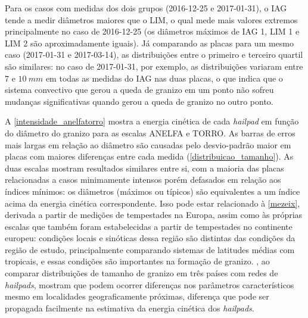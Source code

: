 Para os casos com medidas dos dois grupos (2016-12-25 e 2017-01-31), o IAG tende a medir diâmetros maiores que o LIM, o qual mede mais valores extremos principalmente no caso de 2016-12-25 (os diâmetros máximos de IAG 1, LIM 1 e LIM 2 são aproximadamente iguais). Já comparando as placas para um mesmo caso (2017-01-31 e 2017-03-14), as distribuições entre o primeiro e terceiro quartil são similares: no caso de 2017-01-31, por exemplo, as distribuições variaram entre $7$ e $10\:mm$ em todas as medidas do IAG nas duas placas, o que indica que o sistema convectivo que gerou a queda de granizo em um ponto não sofreu mudanças significativas quando gerou a queda de granizo no outro ponto. 

A \autoref{intensidade_anelfatorro} mostra a energia cinética de cada \textit{hailpad} em função do diâmetro do granizo para as escalas ANELFA e TORRO. As barras de erros mais largas em relação ao diâmetro são causadas pelo desvio-padrão maior em placas com maiores diferenças entre cada medida (\autoref{distribuicao_tamanho}). As duas escalas mostram resultados similares entre si, com a maioria das placas relacionadas a casos minimamente intensos porém defasados em relação aos índices mínimos: os diâmetros (máximos ou típicos) são equivalentes a um índice acima da energia cinética correspondente. Isso pode estar relacionado à \autoref{mezeix}, derivada a partir de medições de tempestades na Europa, assim como às próprias escalas que também foram estabelecidas a partir de tempestades no continente europeu: condições locais e sinóticas dessa região são distintas das condições da região de estudo, principalmente comparando sistemas de latitudes médias com tropicais, e essas condições são importantes na formação de granizo. , ao comparar distribuições de tamanho de granizo em três países com redes de \textit{hailpads}, mostram que podem ocorrer diferenças nos parâmetros característicos mesmo em localidades geograficamente próximas, diferença que pode ser propagada facilmente na estimativa da energia cinética dos \textit{hailpads}.

